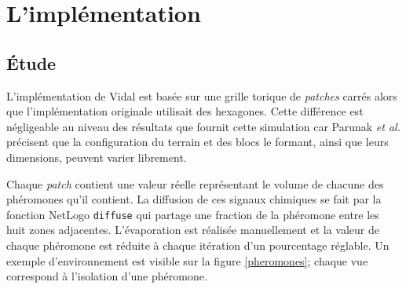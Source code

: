\documentclass[12pt]{article}
\begin{document}
\section{L'implémentation}

\subsection{\'Etude}

L'implémentation de Vidal est basée sur une grille torique de
\textit{patches} carrés alors que l'implémentation originale utilisait
des hexagones. Cette différence est négligeable au niveau des
résultats que fournit cette simulation car Parunak \textit{et al.}
précisent que la configuration du terrain et des blocs le formant,
ainsi que leurs dimensions, peuvent varier librement.

Chaque \textit{patch} contient une valeur réelle représentant le
volume de chacune des phéromones qu'il contient. La diffusion de ces
signaux chimiques se fait par la fonction NetLogo \texttt{diffuse} qui
partage une fraction de la phéromone entre les huit zones
adjacentes. L'évaporation est réalisée manuellement et la valeur de
chaque phéromone est réduite à chaque itération d'un pourcentage
réglable. Un exemple d'environnement est visible sur la figure
\ref{pheromones}; chaque vue correspond à l'isolation d'une phéromone.
\end{document}
